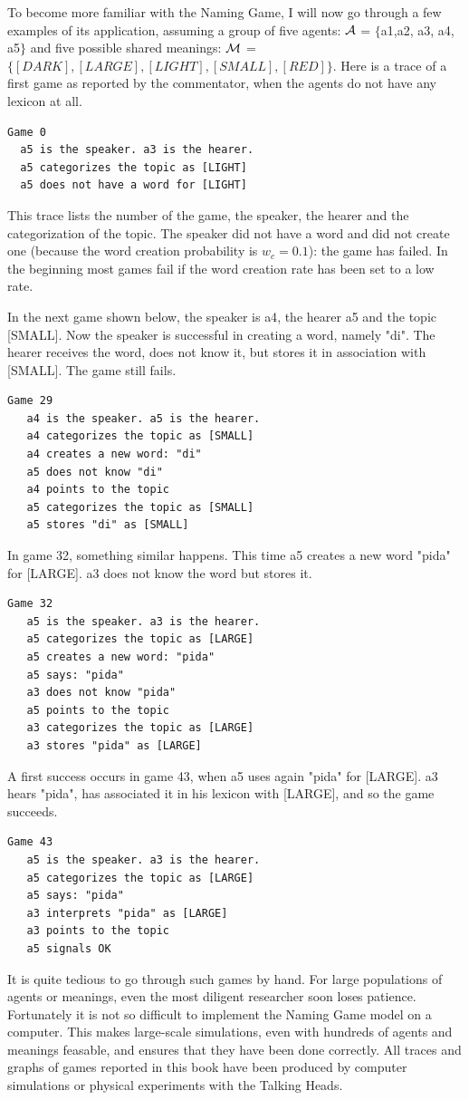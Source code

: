 To become more familiar with the Naming Game, I will now 
go through a few examples of its application, assuming 
a group of five agents: ${\cal A}$ = $\{${\bfshape a1},{\bfshape a2},
{\bfshape a3}, {\bfshape a4}, {\bfshape a5}$\}$ and five possible shared meanings: 
\newline 
${\cal M}$ = $\{[DARK],[LARGE],[LIGHT],[SMALL],[RED]\}$. 
\newline
Here is a trace of a first game as reported by 
the commentator, when the agents do not have any lexicon at
all. 
\begin{verbatim}
Game 0 
  a5 is the speaker. a3 is the hearer. 
  a5 categorizes the topic as [LIGHT]
  a5 does not have a word for [LIGHT]
\end{verbatim}
This trace lists the number of the game, the speaker, the 
hearer and the categorization of
the topic. The speaker did not have a word and did not 
create one (because the word creation probability is 
$w_{c}=0.1$): the game has failed. In the beginning 
most games fail if the word creation rate has been set to a low rate.

In the next game shown below, the speaker is 
{\bfshape a4}, the hearer {\bfshape a5} and the topic
{}[SMALL]. Now the speaker is successful in creating a word, namely 
"di". The hearer receives the word, does not know it,
but stores it in association with [SMALL]. The game still fails. 
\begin{verbatim}
Game 29
   a4 is the speaker. a5 is the hearer. 
   a4 categorizes the topic as [SMALL]
   a4 creates a new word: "di"
   a5 does not know "di"
   a4 points to the topic
   a5 categorizes the topic as [SMALL]
   a5 stores "di" as [SMALL]
\end{verbatim}
In game 32, something similar happens. This time {\bfshape a5} creates
a new word "pida" for [LARGE]. {\bfshape a3} does not know 
the word but stores it. 
\begin{verbatim}
Game 32
   a5 is the speaker. a3 is the hearer. 
   a5 categorizes the topic as [LARGE]
   a5 creates a new word: "pida"
   a5 says: "pida"
   a3 does not know "pida"
   a5 points to the topic
   a3 categorizes the topic as [LARGE]
   a3 stores "pida" as [LARGE]
\end{verbatim}
A first success occurs in game 43, when {\bfshape a5} uses again 
"pida" for [LARGE]. {\bfshape a3} hears "pida", has associated it 
in his lexicon with [LARGE], and so the game succeeds. 
\begin{verbatim}
Game 43
   a5 is the speaker. a3 is the hearer. 
   a5 categorizes the topic as [LARGE]
   a5 says: "pida"
   a3 interprets "pida" as [LARGE]
   a3 points to the topic 
   a5 signals OK
\end{verbatim}
It is quite tedious to go through such games by hand. 
For large populations of agents or meanings, even the 
most diligent researcher soon loses patience. Fortunately 
it is not so difficult to implement the Naming Game model on 
a computer. This makes large-scale simulations, even with 
hundreds of agents and meanings feasable, and ensures
that they have been done correctly.
All traces and graphs of games reported in this book
have been produced by computer simulations or physical 
experiments with the Talking Heads. 

